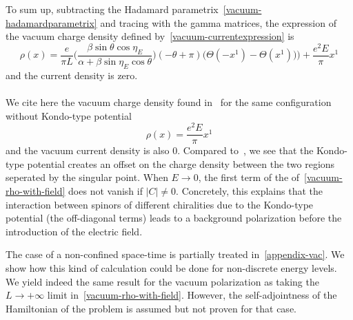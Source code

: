 To sum up,
subtracting the Hadamard parametrix~\cref{vacuum-hadamardparametrix} and tracing with the gamma matrices, 
the expression of the vacuum charge density defined by~\cref{vacuum-currentexpression} is
\begin{equation}\label{vacuum-rho-with-field}
\rho(x) = \frac{e}{\pi L}\Big( \frac{\beta \sin \theta \cos \eta_E}{\alpha + \beta \sin \eta_E \cos \theta}\Big) (-\theta + \pi)
\Big(\Theta(- x^1) - \Theta(x^1))\Big) + \frac{e^2 E}{\pi} x^1
\end{equation}
and the current density is zero. \\\\
%
We cite here the vacuum charge density found in~\cite{Zahn2015} for the same configuration without Kondo-type potential
\begin{equation*}
\rho(x) = \frac{e^2 E}{\pi}x^1
\end{equation*}
and the vacuum current density is also 0.
Compared to~\cite{Zahn2015}, 
we see that the Kondo-type potential creates an offset on the charge density between the two regions seperated by the singular point.
When $E\rightarrow 0$, the first term of the \lhs of~\cref{vacuum-rho-with-field} does not vanish if $|C| \neq 0$.
Concretely, this explains that the interaction between spinors of different chiralities due to the Kondo-type potential (the off-diagonal terms) leads to a background polarization before the introduction of the electric field.
\begin{remark}
The case of a non-confined space-time is partially treated in~\cref{appendix-vac}. 
We show how this kind of calculation could be done for non-discrete energy levels. 
We yield indeed the same result for the vacuum polarization as taking the $L\rightarrow+\infty$ limit in~\cref{vacuum-rho-with-field}. 
However, the self-adjointness of the Hamiltonian of the problem is assumed but not proven for that case.
\end{remark}
